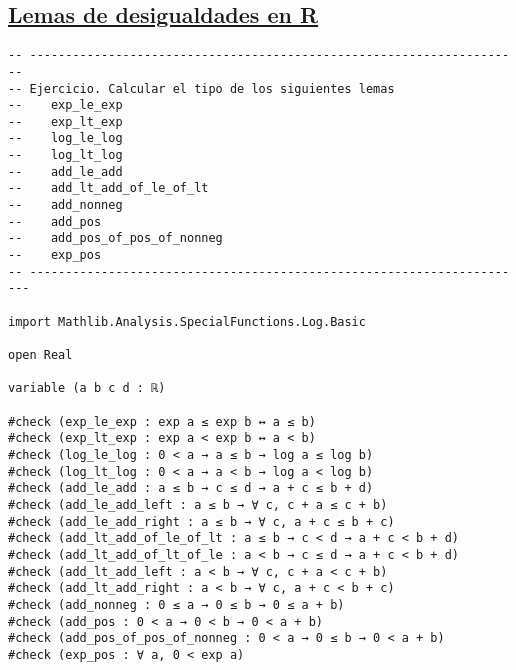 \subsection{\href{./src/Basicos/Lemas\_de\_desigualdades\_en\_R.lean}{Lemas de desigualdades en R}}
\label{sec:org0a39fb4}
\begin{verbatim}
-- ---------------------------------------------------------------------
-- Ejercicio. Calcular el tipo de los siguientes lemas
--    exp_le_exp
--    exp_lt_exp
--    log_le_log
--    log_lt_log
--    add_le_add
--    add_lt_add_of_le_of_lt
--    add_nonneg
--    add_pos
--    add_pos_of_pos_of_nonneg
--    exp_pos
-- ----------------------------------------------------------------------

import Mathlib.Analysis.SpecialFunctions.Log.Basic

open Real

variable (a b c d : ℝ)

#check (exp_le_exp : exp a ≤ exp b ↔ a ≤ b)
#check (exp_lt_exp : exp a < exp b ↔ a < b)
#check (log_le_log : 0 < a → a ≤ b → log a ≤ log b)
#check (log_lt_log : 0 < a → a < b → log a < log b)
#check (add_le_add : a ≤ b → c ≤ d → a + c ≤ b + d)
#check (add_le_add_left : a ≤ b → ∀ c, c + a ≤ c + b)
#check (add_le_add_right : a ≤ b → ∀ c, a + c ≤ b + c)
#check (add_lt_add_of_le_of_lt : a ≤ b → c < d → a + c < b + d)
#check (add_lt_add_of_lt_of_le : a < b → c ≤ d → a + c < b + d)
#check (add_lt_add_left : a < b → ∀ c, c + a < c + b)
#check (add_lt_add_right : a < b → ∀ c, a + c < b + c)
#check (add_nonneg : 0 ≤ a → 0 ≤ b → 0 ≤ a + b)
#check (add_pos : 0 < a → 0 < b → 0 < a + b)
#check (add_pos_of_pos_of_nonneg : 0 < a → 0 ≤ b → 0 < a + b)
#check (exp_pos : ∀ a, 0 < exp a)
\end{verbatim}

